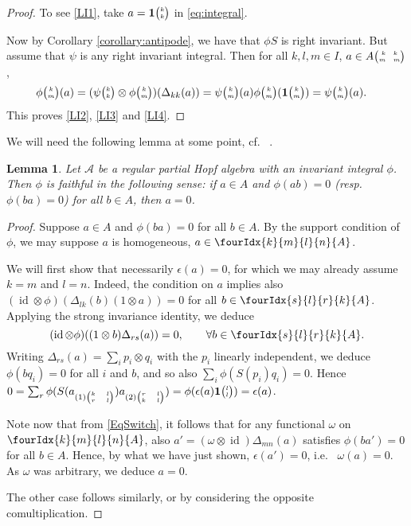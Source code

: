 \documentclass[10pt]{article}
\DeclareMathOperator{\id}{id}
\newcommand{\Grt}[3]{#1{\tiny {\begin{pmatrix} #2\\#3\end{pmatrix}}}}
\newcommand{\UnitC}[2]{\Grt{\mathbf{1}}{#1}{#2}}
\newcommand{\pmat}[4]{{\tiny \begin{pmatrix} #1 \quad #2 \\ #3 \quad #4\end{pmatrix}}}
\newcommand{\Gr}[5]{\fourIdx{#2}{#4}{#3}{#5}{#1}}%
\newtheorem{Lem}[Theorem]{Lemma}
\theoremstyle{definition}
\newcommand{\phic}[2]{\Grt{\phi}{#1}{#2}}
\numberwithin{equation}{section}
\begin{document}
\begin{proof} 
To see \ref{LI1}, take $a=\UnitC{k}{k}$ in \eqref{eq:integral}. 

Now by Corollary \ref{corollary:antipode}, we have that $\phi S$ is right invariant. But assume that $\psi$ is any
 right invariant integral.     Then for all $k,l,m\in I$, $a\in A\pmat{k}{k}{m}{m}$,
    \begin{align*}
      \phic{k}{m}(a)  &= (\Grt{\psi}{k}{k} \otimes
      \phic{k}{m})(\Delta_{kk}(a)) = \Grt{\psi}{k}{m}(a)\Grt{\phi}{k}{m}(\UnitC{k}{m}) = \Grt{\psi}{k}{m}(a) .
    \end{align*}
  This proves \ref{LI2}, \ref{LI3} and \ref{LI4}.  
     \end{proof} 


We will need the following lemma at some point, cf.~ \cite[Proposition 3.4]{VDae2}.

\begin{Lem}\label{LemFaith} Let $\mathscr{A}$ be a regular partial Hopf
  algebra with an invariant integral $\phi$. Then
  $\phi$ is faithful in the following sense: if $a\in A$ and
  $\phi(ab) =0$ (resp. $\phi(ba)=0$) for all $b\in A$, then
  $a=0$.
\end{Lem} 

\begin{proof} Suppose $a\in A$ and $\phi(ba)=0$ for all $b\in A$. By the support condition of $\phi$, we may suppose $a$ is homogeneous, $a\in \Gr{A}{k}{l}{m}{n}$.

We will first show that necessarily $\epsilon(a)=0$, for which we may already assume $k=m$ and $l=n$. Indeed, the condition on $a$ implies also $(\id\otimes \phi)(\Delta_{lk}(b)(1\otimes a))=0$ for all $b\in \Gr{A}{s}{r}{l}{k}$. Applying the strong invariance identity, we deduce \begin{equation}\label{EqSwitch}(\id\otimes \phi)((1\otimes b)\Delta_{rs}(a))=0,\qquad \forall b\in \Gr{A}{s}{r}{l}{k}.\end{equation} Writing $\Delta_{rs}(a) = \sum_i p_i\otimes q_i$ with the $p_i$ linearly independent, we deduce $\phi(bq_i)=0$ for all $i$ and $b$, and so also $\sum_i \phi(S(p_i)q_i)=0$. Hence $0=\sum_r \phi(S(a_{(1){\tiny \begin{pmatrix} k & l \\ r & l \end{pmatrix}}})a_{(2){\tiny \begin{pmatrix} r & l \\ k & l\end{pmatrix}}}) = \phi(\epsilon(a) \UnitC{l}{l}) = \epsilon(a)$.

Note now that from \eqref{EqSwitch}, it follows that for any functional $\omega$ on $\Gr{A}{k}{l}{m}{n}$, also $a'=(\omega\otimes \id)\Delta_{mn}(a)$ satisfies $\phi(ba')=0$ for all $b\in A$. Hence, by what we have just shown, $\epsilon(a')=0$, i.e.~ $\omega(a)=0$. As $\omega$ was arbitrary, we deduce $a=0$.

The other case follows similarly, or by considering the opposite comultiplication.
\end{proof} 
\end{document}
